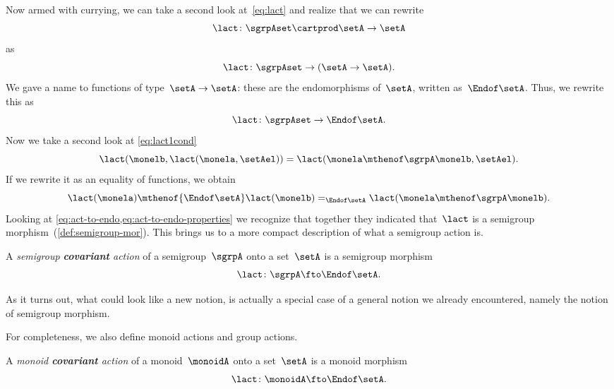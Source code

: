 Now armed with currying, we can take a second look at~\cref{eq:lact} and realize that we can rewrite
\begin{equation}
	\label{eq:currying-lact-1}
	\lact \colon \sgrpAset \cartprod \setA \to \setA
\end{equation}
as
\begin{equation}
	\label{eq:currying-lact-2}
	\lact \colon \sgrpAset \to (\setA \to \setA).
\end{equation}
%
We gave a name to functions of type~$\setA \to \setA$: these are the endomorphisms of~$\setA$, written as~$\Endof\setA$.
Thus, we rewrite this as
%
\begin{equation}
	\label{eq:act-to-endo}
	\lact \colon \sgrpAset \to \Endof\setA.
\end{equation}
%
Now we take a second look at \cref{eq:lact1cond}
%
\begin{equation}
	\label{eq:lact1cond-2}
	\lact(\monelb, \lact(\monela, \setAel)) = \lact(\monela \mthenof\sgrpA \monelb, \setAel).
\end{equation}
%
If we rewrite it as an equality of functions, we obtain
%
\begin{equation}
	\label{eq:act-to-endo-properties}
	\lact(\monela) \mthenof{\Endof\setA}  \lact(\monelb) =_{\Endof\setA} \lact(\monela \mthenof\sgrpA \monelb).
\end{equation}
%
Looking at \cref{eq:act-to-endo,eq:act-to-endo-properties} we recognize that together they indicated that~$\lact$ is a semigroup morphism~(\cref{def:semigroup-mor}).
This brings us to a more compact description of what a semigroup action is.

\begin{ctdefinition}
	\label{def:semigroup-cov-action}
	A \emph{semigroup \textbf{covariant} action} of a semigroup~$\sgrpA$ onto a set~$\setA$ is a semigroup morphism
	\begin{equation}
		\label{eq:act-semigroup}
		\lact \colon \sgrpA \fto \Endof\setA.
	\end{equation}
\end{ctdefinition}

As it turns out, what could look like a new notion, is actually a special case of a general notion we already encountered, namely the notion of semigroup morphism.

For completeness, we also define monoid actions and group actions.

\begin{ctdefinition}
	\label{def:monoid-cov-action}
	A \emph{monoid \textbf{covariant} action} of a monoid~$\monoidA$ onto a set~$\setA$ is a monoid morphism
	\begin{equation}
		\label{eq:act-monoid}
		\lact \colon \monoidA \fto \Endof\setA.
	\end{equation}
\end{ctdefinition}

